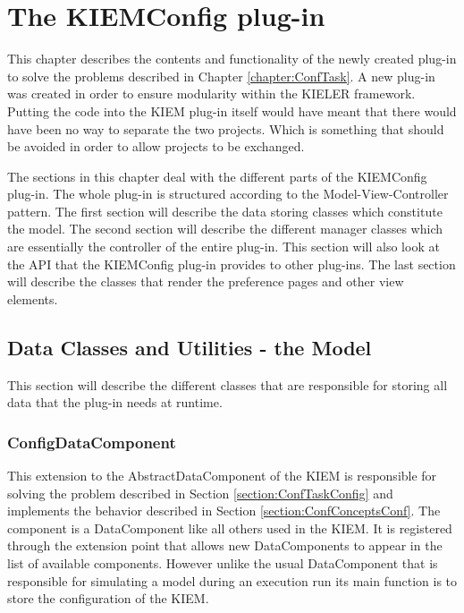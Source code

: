 \chapter{The KIEMConfig plug-in}
\label{chapter:KiemConfig}
This chapter describes the contents and functionality of the newly created
plug-in to solve the problems described in Chapter \ref{chapter:ConfTask}.
A new plug-in was created in order to ensure modularity within the \ac{KIELER} framework.
Putting the code into the \ac{KIEM} plug-in itself would have meant that
there would have been no way to separate the two projects. Which is something that 
should be avoided in order to allow projects to be exchanged. 

The sections in this chapter deal with the different parts of the \ac{KIEMConfig} plug-in.
The whole plug-in is structured according to the Model-View-Controller pattern.
The first section will describe the data storing classes which constitute the model.
The second section will describe the different manager classes which are essentially the
controller of the entire plug-in. This section will also look at the \ac{API} that the
\ac{KIEMConfig} plug-in provides to other plug-ins.
The last section will describe the classes that render the preference pages and other
view elements.

\section{Data Classes and Utilities - the Model}
\label{section:ConfModel}
This section will describe the different classes that are responsible for storing all
data that the plug-in needs at runtime.


\subsection{ConfigDataComponent}
\label{section:ConfigDataComponent}
This extension to the AbstractDataComponent of the \ac{KIEM} is responsible for solving
the problem described in Section \ref{section:ConfTaskConfig} and implements the behavior
described in Section \ref{section:ConfConceptsConf}. The component is a DataComponent
like all others used in the \ac{KIEM}. It is registered through the extension point
that allows new DataComponents to appear in the list of available components.
However unlike the usual DataComponent that is responsible for simulating a model during
an execution run its main function is to store the configuration of the \ac{KIEM}.

